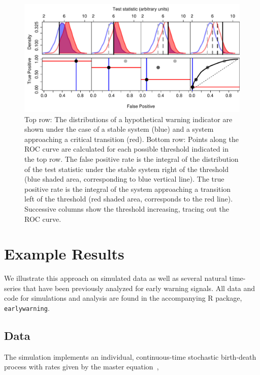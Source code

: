\documentclass[authoryear,review,11pt]{elsarticle}
\begin{document}
\begin{figure}
   \begin{center}
     \includegraphics[width=\linewidth]{figures/Fig1.pdf}
     \caption{Top row: The distributions of a hypothetical warning indicator are shown under the case of a stable system (blue) and a system approaching a critical transition (red).  Bottom row: Points along the ROC curve are calculated for each possible threshold indicated in the top row.  The false positive rate is the integral of the distribution of the test statistic under the stable system right of the threshold (blue shaded area, corresponding to blue vertical line).  The true positive rate is the integral of the system approaching a transition left of the threshold (red shaded area, corresponds to the red line).  Successive columns show the threshold increasing, tracing out the ROC curve.}
     \label{fig:roc_intro}
  \end{center}
 \end{figure}





\section{Example Results}
We illustrate this approach on simulated data as well as several natural time-series that have been previously analyzed for early warning signals.  All data and code for simulations and analysis are found in the accompanying R package, \verb|earlywarning|.


\subsection*{Data}
The simulation implements an individual, continuous-time stochastic birth-death process with rates given by the master equation~\citep{Gardiner2009},
\end{document}
